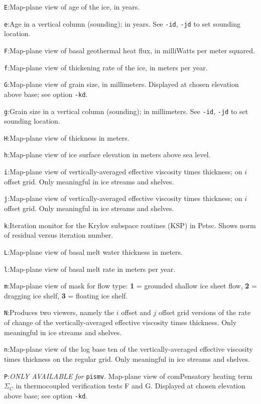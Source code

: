 \documentclass[12pt,final]{amsart}
\renewcommand{\t}[1]{\texttt{#1}}
\begin{document}
\verb|E|:\quad Map-plane view of age of the ice, in years.

\verb|e|:\quad Age in a vertical column (sounding); in years.  See \verb|-id|, \verb|-jd| to set sounding location.

\verb|F|:\quad Map-plane view of basal geothermal heat flux, in milliWatts per meter squared.

\verb|f|:\quad Map-plane view of thickening rate of the ice, in meters per year.

\verb|G|:\quad Map-plane view of grain size, in millimeters.  Displayed at chosen elevation above base; see option \verb|-kd|.

\verb|g|:\quad Grain size in a vertical column (sounding); in millimeters.  See \verb|-id|, \verb|-jd| to set sounding location.

\verb|H|:\quad Map-plane view of thickness in meters.

\verb|h|:\quad Map-plane view of ice surface elevation in meters above sea level.

\verb|i|:\quad Map-plane view of vertically-averaged effective viscosity times thickness; on $i$ offset grid.  Only meaningful in ice streams and shelves.

\verb|j|:\quad Map-plane view of vertically-averaged effective viscosity times thickness; on $i$ offset grid.  Only meaningful in ice streams and shelves.

\verb|k|:\quad Iteration monitor for the Krylov subspace routines (KSP) in Petsc.  Shows norm of residual versus iteration number.

\verb|L|:\quad Map-plane view of basal melt water thickness in meters.

\verb|l|:\quad Map-plane view of basal melt rate in meters per year.

\verb|m|:\quad Map-plane view of mask for flow type:  \textbf{1} = grounded shallow ice sheet flow,  \textbf{2} = dragging ice shelf, \textbf{3} = floating ice shelf.

\verb|N|:\quad Produces two viewers, namely the $i$ offset and $j$ offset grid versions of the rate of change of the vertically-averaged effective viscosity times thickness.  Only meaningful in ice streams and shelves.

\verb|n|:\quad Map-plane view of the log base ten of the vertically-averaged effective viscosity times thickness on the regular grid.  Only meaningful in ice streams and shelves.

\verb|P|:\quad \emph{ONLY AVAILABLE for }\t{pismv}.  Map-plane view of comPensatory heating term $\Sigma_C$ in thermocoupled verification tests F and G.  Displayed at chosen elevation above base; see option \verb|-kd|.
\end{document}

